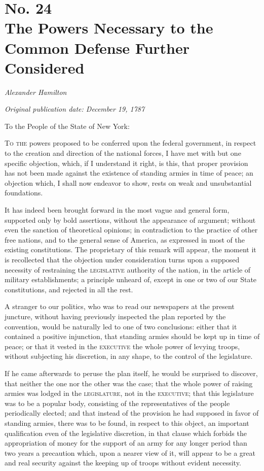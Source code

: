 \chapter[No. 24: The Powers Necessary to the Common Defense Further Considered]{No. 24\\ {\small The Powers Necessary to the Common Defense Further Considered}}

\textit{Alexander Hamilton}

\textit{Original publication date: December 19, 1787}
\vspace{1cm}

To the People of the State of New York:
\vspace{.4cm}

\textsc{To the} powers proposed to be conferred upon the federal government, in respect to the creation and direction of the national forces, I have met with but one specific objection, which, if I understand it right, is this, that proper provision has not been made against the existence of standing armies in time of peace; an objection which, I shall now endeavor to show, rests on weak and unsubstantial foundations.

It has indeed been brought forward in the most vague and general form, supported only by bold assertions, without the appearance of argument; without even the sanction of theoretical opinions; in contradiction to the practice of other free nations, and to the general sense of America, as expressed in most of the existing constitutions. 
The proprietary of this remark will appear, the moment it is recollected that the objection under consideration turns upon a supposed necessity of restraining the \textsc{legislative} authority of the nation, in the article of military establishments; a principle unheard of, except in one or two of our State constitutions, and rejected in all the rest.

A stranger to our politics, who was to read our newspapers at the present juncture, without having previously inspected the plan reported by the convention, would be naturally led to one of two conclusions: either that it contained a positive injunction, that standing armies should be kept up in time of peace; or that it vested in the \textsc{executive} the whole power of levying troops, without subjecting his discretion, in any shape, to the control of the legislature.

If he came afterwards to peruse the plan itself, he would be surprised to discover, that neither the one nor the other was the case; that the whole power of raising armies was lodged in the \textsc{legislature}, not in the \textsc{executive}; that this legislature was to be a popular body, consisting of the representatives of the people periodically elected; and that instead of the provision he had supposed in favor of standing armies, there was to be found, in respect to this object, an important qualification even of the legislative discretion, in that clause which forbids the appropriation of money for the support of an army for any longer period than two years a precaution which, upon a nearer view of it, will appear to be a great and real security against the keeping up of troops without evident necessity.

